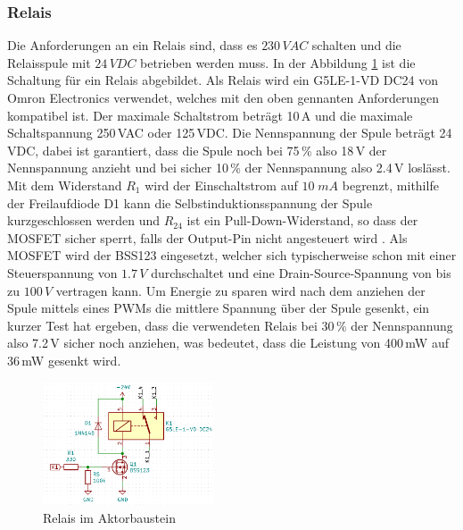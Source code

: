 \subsubsection{Relais}
Die Anforderungen an ein Relais sind, dass es $230\,VAC$ schalten und die Relaisspule mit $24\,VDC$ betrieben werden muss. In der Abbildung \ref{pic: Relais_aktor} ist die Schaltung für ein Relais abgebildet. Als Relais wird ein G5LE-1-VD DC24 von Omron Electronics verwendet, welches mit den oben gennanten Anforderungen kompatibel ist. Der maximale Schaltstrom beträgt 10\,A und die maximale Schaltspannung 250\,VAC oder 125\,VDC. Die Nennspannung der Spule beträgt 24\,VDC, dabei ist garantiert, dass die Spule noch bei 75\,\% also 18\,V der Nennspannung anzieht und bei sicher 10\,\% der Nennspannung also 2.4\,V loslässt. Mit dem Widerstand $R_1$ wird der Einschaltstrom auf $10\;mA$ begrenzt, mithilfe der Freilaufdiode D1 kann die Selbstinduktionsspannung der Spule kurzgeschlossen werden und $R_{24}$ ist ein Pull-Down-Widerstand, so dass der MOSFET sicher sperrt, falls der Output-Pin nicht angesteuert wird \cite{mikrocontroller.net_relais_nodate}. Als MOSFET wird der BSS123 eingesetzt, welcher sich typischerweise schon mit einer Steuerspannung von $1.7\,V$ durchschaltet und eine Drain-Source-Spannung von bis zu $100\,V$ vertragen kann. Um Energie zu sparen wird nach dem anziehen der Spule mittels eines PWMs die mittlere Spannung über der Spule gesenkt, ein kurzer Test hat ergeben, dass die verwendeten Relais bei 30\,\% der Nennspannung also 7.2\,V sicher noch anziehen, was bedeutet, dass die Leistung von 400\,mW auf 36\,mW gesenkt wird.
\begin{figure}[h!]
	\centering
	\includegraphics[width=0.45\textwidth]{graphics/shematics_relais.png}
	\caption{Relais im Aktorbaustein}
	\label{pic: Relais_aktor}
\end{figure}

